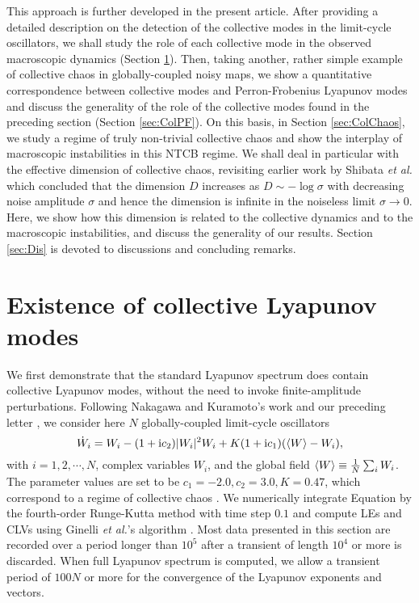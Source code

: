 \documentclass[12pt]{iopart}
\begin{document}
This approach is further developed in the present article.
After providing a detailed description on the detection
 of the collective modes in the limit-cycle oscillators,
 we shall study the role of each collective mode
 in the observed macroscopic dynamics (Section \ref{sec:Col}).
Then, taking another, rather simple example of collective chaos
 in globally-coupled noisy maps,
 we show a quantitative correspondence between
 collective modes and Perron-Frobenius Lyapunov modes
 and discuss the generality of the role of the collective modes
 found in the preceding section (Section \ref{sec:ColPF}).
On this basis, in Section \ref{sec:ColChaos}, we study
 a regime of truly non-trivial collective chaos
 and show the interplay of macroscopic instabilities in this NTCB regime.
We shall deal in particular with the effective dimension of collective chaos,
 revisiting earlier work by Shibata \textit{et al.} \cite{Shibata.etal-PRL1999}
 which concluded that the dimension $D$ increases as $D \sim -\log\sigma$
 with decreasing noise amplitude $\sigma$ and hence
 the dimension is infinite in the noiseless limit $\sigma\to 0$.
Here, we show how this dimension is related to the collective dynamics
 and to the macroscopic instabilities, and discuss the generality of our results.
Section \ref{sec:Dis} is devoted to discussions and concluding remarks.


\section{Existence of collective Lyapunov modes}  \label{sec:Col}

We first demonstrate that the standard Lyapunov spectrum does contain
 collective Lyapunov modes,
 without the need to invoke finite-amplitude perturbations.
Following
 Nakagawa and Kuramoto's work
 \cite{Nakagawa.Kuramoto-PTP1993,Nakagawa.Kuramoto-PD1995} and
 our preceding letter \cite{Takeuchi.etal-PRL2009},
 we consider here $N$ globally-coupled limit-cycle oscillators
\begin{equation}
 \dot{W}_i = W_i - (1+\mathrm{i}c_2)|W_i|^2 W_i + K (1+\mathrm{i}c_1) (\langle W \rangle - W_i),  \label{eq:GLDef}
\end{equation}
 with $i=1,2,\cdots, N$, complex variables $W_i$,
 and the global field $\langle W \rangle \equiv \frac{1}{N}\sum_i W_i$.
The parameter values are set to be $c_1 = -2.0, c_2 = 3.0, K = 0.47$,
 which correspond to a regime of collective chaos \cite{Nakagawa.Kuramoto-PTP1993,Nakagawa.Kuramoto-PD1995,Takeuchi.etal-PRL2009}.
We numerically integrate Equation  by the fourth-order
 Runge-Kutta method with time step $0.1$
 and compute LEs and CLVs using Ginelli \textit{et al.}'s algorithm
 \cite{Ginelli.etal-PRL2007,Ginelli.etal-JPA2012}.
Most data presented in this section are recorded
 over a period longer than $10^5$
 after a transient of length $10^4$ or more is discarded.
When full Lyapunov spectrum is computed,
 we allow a transient period of $100N$ or more
 for the convergence of the Lyapunov exponents and vectors.
\end{document}
